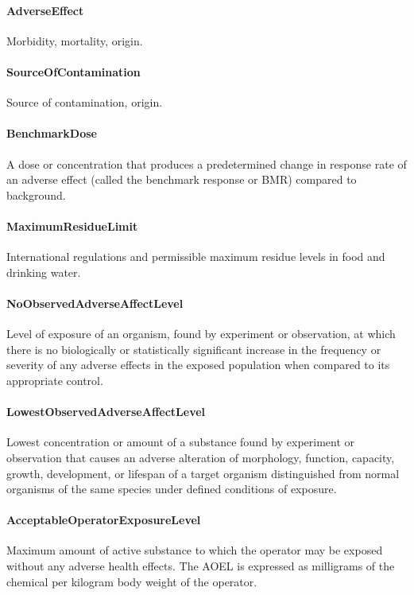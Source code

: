 \documentclass[a4paper]{report}
\begin{document}
\paragraph{AdverseEffect}
Morbidity, mortality, origin.

\paragraph{SourceOfContamination}
Source of contamination, origin.

\paragraph{BenchmarkDose}
A dose or concentration that produces a predetermined change in response rate of an adverse effect (called the benchmark response or BMR) compared to background.

\paragraph{MaximumResidueLimit}
International regulations and permissible maximum residue levels in food and drinking water.

\paragraph{NoObservedAdverseAffectLevel}
Level of exposure of an organism, found by experiment or observation, at which there is no biologically or statistically significant increase in the frequency or severity of any adverse effects in the exposed population when compared to its appropriate control.

\paragraph{LowestObservedAdverseAffectLevel}
Lowest concentration or amount of a substance found by experiment or observation that causes an adverse alteration of morphology, function, capacity, growth, development, or lifespan of a target organism distinguished from normal organisms of the same species under defined conditions of exposure.

\paragraph{AcceptableOperatorExposureLevel}
Maximum amount of active substance to which the operator may be exposed without any adverse health effects. The AOEL is expressed as milligrams of the chemical per kilogram body weight of the operator.
\end{document}
